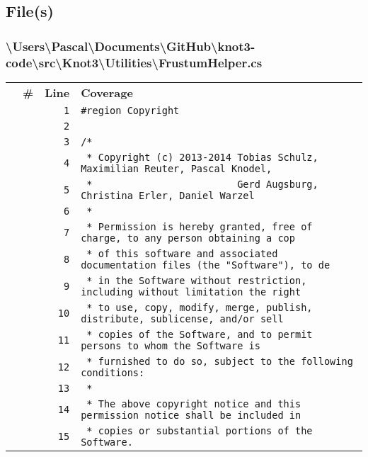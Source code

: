 \documentclass[a4paper,10pt]{article}
\begin{document}
\subsection{File(s)}
\subsubsection{\textbackslash Users\textbackslash Pascal\textbackslash Documents\textbackslash GitHub\textbackslash knot3-code\textbackslash src\textbackslash Knot3\textbackslash Utilities\textbackslash FrustumHelper.cs}
\begin{longtable}[l]{lrrl}
\textbf{} & \textbf{\#} & \textbf{Line} & \textbf{Coverage}\\
\cellcolor{gray} &  & \verb~1~ & \verb~#region Copyright~\\
\cellcolor{gray} &  & \verb~2~ & \verb~~\\
\cellcolor{gray} &  & \verb~3~ & \verb~/*~\\
\cellcolor{gray} &  & \verb~4~ & \verb~ * Copyright (c) 2013-2014 Tobias Schulz, Maximilian Reuter, Pascal Knodel,~\\
\cellcolor{gray} &  & \verb~5~ & \verb~ *                         Gerd Augsburg, Christina Erler, Daniel Warzel~\\
\cellcolor{gray} &  & \verb~6~ & \verb~ *~\\
\cellcolor{gray} &  & \verb~7~ & \verb~ * Permission is hereby granted, free of charge, to any person obtaining a cop~\\
\cellcolor{gray} &  & \verb~8~ & \verb~ * of this software and associated documentation files (the "Software"), to de~\\
\cellcolor{gray} &  & \verb~9~ & \verb~ * in the Software without restriction, including without limitation the right~\\
\cellcolor{gray} &  & \verb~10~ & \verb~ * to use, copy, modify, merge, publish, distribute, sublicense, and/or sell~\\
\cellcolor{gray} &  & \verb~11~ & \verb~ * copies of the Software, and to permit persons to whom the Software is~\\
\cellcolor{gray} &  & \verb~12~ & \verb~ * furnished to do so, subject to the following conditions:~\\
\cellcolor{gray} &  & \verb~13~ & \verb~ *~\\
\cellcolor{gray} &  & \verb~14~ & \verb~ * The above copyright notice and this permission notice shall be included in ~\\
\cellcolor{gray} &  & \verb~15~ & \verb~ * copies or substantial portions of the Software.~\\

\end{longtable}
\end{document}
